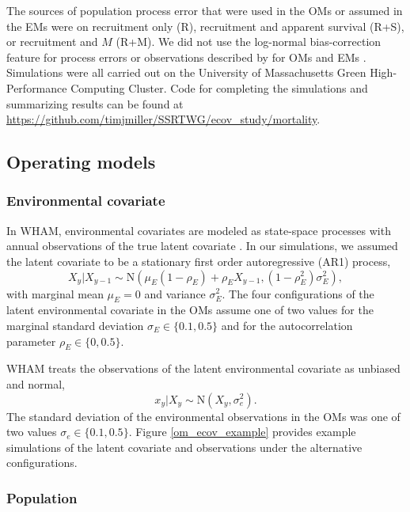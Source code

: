 \documentclass[
  12pt,
]{article}
\begin{document}
The sources of population process error that were used in the OMs or assumed in the EMs were on recruitment only (R), recruitment and apparent survival (R+S), or recruitment and \(M\) (R+M). We did not use the log-normal bias-correction feature for process errors or observations described by \citet{stockmiller21} for OMs and EMs \citep{lietal26}. Simulations were all carried out on the University of Massachusetts Green High-Performance Computing Cluster. Code for completing the simulations and summarizing results can be found at \url{https://github.com/timjmiller/SSRTWG/ecov_study/mortality}.

\subsection*{Operating models}\label{operating-models}

\subsubsection*{Environmental covariate}\label{environmental-covariate}

In WHAM, environmental covariates are modeled as state-space processes with annual observations of the true latent covariate \citep{milleretal16, stockmiller21}. In our simulations, we assumed the latent covariate to be a stationary first order autoregressive (AR1) process,
\[
X_y|X_{y-1} \sim \text{N}\left(\mu_E\left(1-\rho_E\right) + \rho_E X_{y-1}, \left(1-\rho_E^2\right)\sigma^2_E\right),
\]
with marginal mean \(\mu_E=0\) and variance \(\sigma^2_E\). The four configurations of the latent environmental covariate in the OMs assume one of two values for the marginal standard deviation \(\sigma_E \in \{0.1, 0.5\}\) and for the autocorrelation parameter \(\rho_E \in \{0, 0.5\}\).

WHAM treats the observations of the latent environmental covariate as unbiased and normal,
\[
x_y|X_y \sim \text{N}\left(X_y,\sigma^2_e\right).
\]
The standard deviation of the environmental observations in the OMs was one of two values \(\sigma_e \in \{0.1, 0.5\}\). Figure \ref{om_ecov_example} provides example simulations of the latent covariate and observations under the alternative configurations.

\subsubsection*{Population}\label{population}
\end{document}
